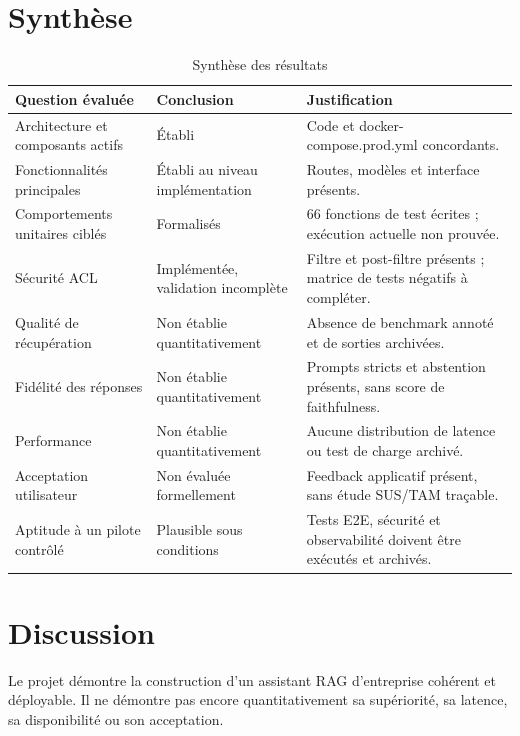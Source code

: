 \section{Synthèse}
\begin{table}[H]
\centering
\caption{Synthèse des résultats}
\label{tab:summary_results_ch7}
\begin{tabular}{p{4.0cm}p{3.7cm}p{5.8cm}}
\toprule
\textbf{Question évaluée} & \textbf{Conclusion} & \textbf{Justification} \\
\midrule
Architecture et composants actifs & Établi & Code et docker-compose.prod.yml concordants. \\
Fonctionnalités principales & Établi au niveau implémentation & Routes, modèles et interface présents. \\
Comportements unitaires ciblés & Formalisés & 66 fonctions de test écrites ; exécution actuelle non prouvée. \\
Sécurité ACL & Implémentée, validation incomplète & Filtre et post-filtre présents ; matrice de tests négatifs à compléter. \\
Qualité de récupération & Non établie quantitativement & Absence de benchmark annoté et de sorties archivées. \\
Fidélité des réponses & Non établie quantitativement & Prompts stricts et abstention présents, sans score de faithfulness. \\
Performance & Non établie quantitativement & Aucune distribution de latence ou test de charge archivé. \\
Acceptation utilisateur & Non évaluée formellement & Feedback applicatif présent, sans étude SUS/TAM traçable. \\
Aptitude à un pilote contrôlé & Plausible sous conditions & Tests E2E, sécurité et observabilité doivent être exécutés et archivés. \\
\bottomrule
\end{tabular}
\end{table}

\section{Discussion}
Le projet démontre la construction d'un assistant RAG d'entreprise cohérent et déployable. Il ne démontre pas encore quantitativement sa supériorité, sa latence, sa disponibilité ou son acceptation.

